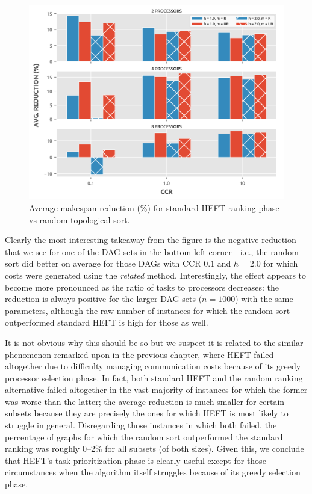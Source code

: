 \documentclass[12pt]{article}
\begin{document}
\begin{figure}
	\centering	
	\includegraphics[scale=0.8]{100tasks_reductions.png}
	\caption{Average makespan reduction (\%) for standard HEFT ranking phase vs random topological sort.}	
	\label{plot.benchmark_reductions_100}
\end{figure}

Clearly the most interesting takeaway from the figure is the negative reduction that we see for one of the DAG sets in the bottom-left corner---i.e., the random sort did better on average for those DAGs with CCR $0.1$ and $h = 2.0$ for which costs were generated using the {\em related} method. Interestingly, the effect appears to become more pronounced as the ratio of tasks to processors decreases: the reduction is always positive for the larger DAG sets ($n = 1000$) with the same parameters, although the raw number of instances for which the random sort outperformed standard HEFT is high for those as well. 

It is not obvious why this should be so but we suspect it is related to the similar phenomenon remarked upon in the previous chapter, where HEFT failed altogether due to difficulty managing communication costs because of its greedy processor selection phase. In fact, both standard HEFT and the random ranking alternative failed altogether in the vast majority of instances for which the former was worse than the latter; the average reduction is much smaller for certain subsets because they are precisely the ones for which HEFT is most likely to struggle in general. Disregarding those instances in which both failed, the percentage of graphs for which the random sort outperformed the standard ranking was roughly $0$--$2\%$ for all subsets (of both sizes). Given this, we conclude that HEFT's task prioritization phase is clearly useful except for those circumstances when the algorithm itself struggles because of its greedy selection phase. 
\end{document}
